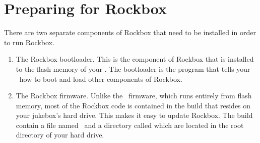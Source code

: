 \section{Preparing for Rockbox}
There are two separate components of Rockbox that need to be installed in order to run Rockbox.
\begin{enumerate}
\item The Rockbox bootloader. This is the component of Rockbox that is installed to the flash memory of your \playerman. The bootloader is the program that tells your \dap\ how to boot and load other components of Rockbox.
\item The Rockbox firmware. Unlike the \playerman\ firmware, which runs entirely from flash memory, most of the Rockbox code is contained in the build that resides on your jukebox's hard drive. This makes it easy to update Rockbox. The build contain a file named \firmwarefilename\ and a directory called  which are located in the root directory of your  hard drive.
\end{enumerate}
